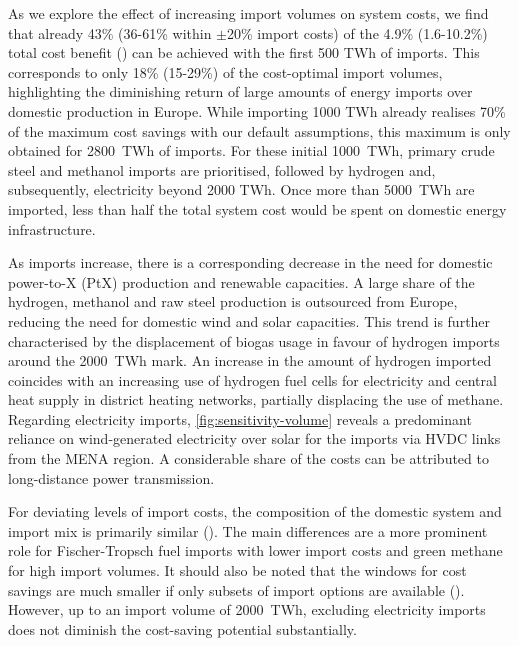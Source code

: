 As we explore the effect of increasing import volumes on system costs, we find
that already 43\% (36-61\% within $\pm$20\% import costs) of the 4.9\%
(1.6-10.2\%) total cost benefit () can be achieved with the first 500
TWh of imports. This corresponds to only 18\% (15-29\%) of the cost-optimal
import volumes, highlighting the diminishing return of large amounts of energy
imports over domestic production in Europe. While importing 1000 TWh already
realises 70\% of the maximum cost savings with our default assumptions, this
maximum is only obtained for 2800~TWh of imports. For these initial 1000~TWh,
primary crude steel and methanol imports are prioritised, followed by hydrogen
and, subsequently, electricity beyond 2000 TWh. Once more than 5000~TWh are
imported, less than half the total system cost would be spent on domestic energy
infrastructure.

As imports increase, there is a corresponding decrease in the need for domestic
power-to-X (PtX) production and renewable capacities. A large share of the
hydrogen, methanol and raw steel production is outsourced from Europe, reducing
the need for domestic wind and solar capacities. This trend is further characterised by the
displacement of biogas usage in favour of hydrogen imports around the 2000~TWh
mark. An increase in the amount of hydrogen imported coincides with an
increasing use of hydrogen fuel cells for electricity and central heat supply in
district heating networks, partially displacing the use of methane. Regarding
electricity imports, \cref{fig:sensitivity-volume} reveals a predominant
reliance on wind-generated electricity over solar for the imports via HVDC links
from the MENA region.
A considerable share of the costs can be attributed to
long-distance power transmission.


For deviating levels of import costs, the composition of the domestic system and
import mix is primarily similar (). The main differences
are a more prominent role for Fischer-Tropsch fuel imports with lower import
costs and green methane for high import volumes. It should also be noted that
the windows for cost savings are much smaller if only subsets of import options
are available (). However, up to an import
volume of 2000~TWh, excluding electricity imports does not diminish the
cost-saving potential substantially.

